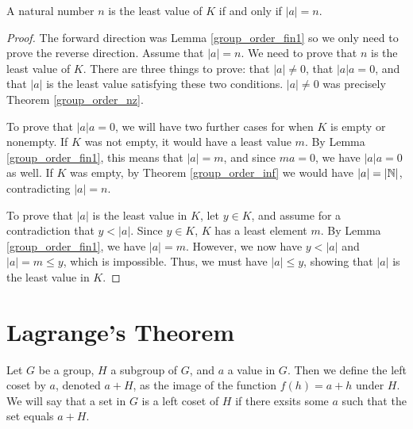 \documentclass[../../math.tex]{subfiles}
\begin{document}
\begin{theorem} \label{group_order_fin}
    A natural number $n$ is the least value of $K$ if and only if $|a| = n$.
\end{theorem}
\begin{proof}
    The forward direction was Lemma \ref{group_order_fin1} so we only need to
    prove the reverse direction.  Assume that $|a| = n$.  We need to prove that
    $n$ is the least value of $K$.  There are three things to prove: that $|a|
    \neq 0$, that $|a|a = 0$, and that $|a|$ is the least value satisfying these
    two conditions.  $|a| \neq 0$ was precisely Theorem \ref{group_order_nz}.

    To prove that $|a|a = 0$, we will have two further cases for when $K$ is
    empty or nonempty.  If $K$ was not empty, it would have a least value $m$.
    By Lemma \ref{group_order_fin1}, this means that $|a| = m$, and since $ma =
    0$, we have $|a|a = 0$ as well.  If $K$ was empty, by Theorem
    \ref{group_order_inf} we would have $|a| = |\mathbb{N}|$, contradicting $|a| = n$.

    To prove that $|a|$ is the least value in $K$, let $y \in K$, and assume for
    a contradiction that $y < |a|$.  Since $y \in K$, $K$ has a least element
    $m$.  By Lemma \ref{group_order_fin1}, we have $|a| = m$.  However, we now
    have $y < |a|$ and $|a| = m \leq y$, which is impossible.  Thus, we must
    have $|a| \leq y$, showing that $|a|$ is the least value in $K$.
\end{proof}

\section{Lagrange's Theorem}

\begin{definition}
    Let $G$ be a group, $H$ a subgroup of $G$, and $a$ a value in $G$.  Then we
    define the left coset by $a$, denoted $a + H$, as the image of the function
    $f(h) = a + h$ under $H$.  We will say that a set in $G$ is a left coset of
    $H$ if there exsits some $a$ such that the set equals $a + H$.
\end{definition}
\end{document}
